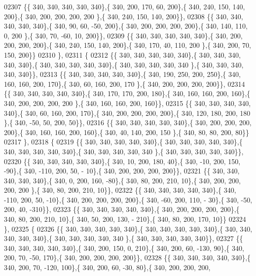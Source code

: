 \begin{DoxyCode}
02307 \{\{ 340, 340, 340, 340, 340\},\{ 340, 200, 170,  60, 200\},\{ 340, 240, 150, 140, 200\},\{ 340, 200, 200, 200, 200
      \},\{ 340, 240, 150, 140, 200\}\},
02308 \{\{ 340, 340, 340, 340, 340\},\{ 340,  90,  60, -50, 200\},\{ 340, 200, 200, 200, 200\},\{ 340, 140, 110,   0, 200
      \},\{ 340,  70, -60,  10, 200\}\},
02309 \{\{ 340, 340, 340, 340, 340\},\{ 340, 200, 200, 200, 200\},\{ 340, 240, 150, 140, 200\},\{ 340, 170,  40, 110, 200
      \},\{ 340, 200,  70, 150, 200\}\}
02310 \},
02311 \{
02312 \{\{ 340, 340, 340, 340, 340\},\{ 340, 340, 340, 340, 340\},\{ 340, 340, 340, 340, 340\},\{ 340, 340, 340, 340, 340
      \},\{ 340, 340, 340, 340, 340\}\},
02313 \{\{ 340, 340, 340, 340, 340\},\{ 340, 190, 250, 200, 250\},\{ 340, 160, 160, 200, 170\},\{ 340,  60, 160, 200, 170
      \},\{ 340, 200, 200, 200, 200\}\},
02314 \{\{ 340, 340, 340, 340, 340\},\{ 340, 170, 170, 200, 180\},\{ 340, 160, 160, 200, 160\},\{ 340, 200, 200, 200, 200
      \},\{ 340, 160, 160, 200, 160\}\},
02315 \{\{ 340, 340, 340, 340, 340\},\{ 340,  60, 160, 200, 170\},\{ 340, 200, 200, 200, 200\},\{ 340, 120, 180, 200, 180
      \},\{ 340, -50,  50, 200,  50\}\},
02316 \{\{ 340, 340, 340, 340, 340\},\{ 340, 200, 200, 200, 200\},\{ 340, 160, 160, 200, 160\},\{ 340,  40, 140, 200, 150
      \},\{ 340,  80,  80, 200,  80\}\}
02317 \},
02318 \{
02319 \{\{ 340, 340, 340, 340, 340\},\{ 340, 340, 340, 340, 340\},\{ 340, 340, 340, 340, 340\},\{ 340, 340, 340, 340, 340
      \},\{ 340, 340, 340, 340, 340\}\},
02320 \{\{ 340, 340, 340, 340, 340\},\{ 340,  10, 200, 180,  40\},\{ 340, -10, 200, 150, -90\},\{ 340, -110, 200,  50, -
      10\},\{ 340, 200, 200, 200, 200\}\},
02321 \{\{ 340, 340, 340, 340, 340\},\{ 340,   0, 200, 160, -80\},\{ 340,  80, 200, 210,  10\},\{ 340, 200, 200, 200, 200
      \},\{ 340,  80, 200, 210,  10\}\},
02322 \{\{ 340, 340, 340, 340, 340\},\{ 340, -110, 200,  50, -10\},\{ 340, 200, 200, 200, 200\},\{ 340, -60, 200, 110, -
      30\},\{ 340, -50, 200,  40, -310\}\},
02323 \{\{ 340, 340, 340, 340, 340\},\{ 340, 200, 200, 200, 200\},\{ 340,  80, 200, 210,  10\},\{ 340,  50, 200, 130, -
      210\},\{ 340,  80, 200, 170,  10\}\}
02324 \},
02325 \{
02326 \{\{ 340, 340, 340, 340, 340\},\{ 340, 340, 340, 340, 340\},\{ 340, 340, 340, 340, 340\},\{ 340, 340, 340, 340, 340
      \},\{ 340, 340, 340, 340, 340\}\},
02327 \{\{ 340, 340, 340, 340, 340\},\{ 340, 200, 150,   0, 210\},\{ 340, 200,  60, -130,  90\},\{ 340, 200,  70, -50, 
      170\},\{ 340, 200, 200, 200, 200\}\},
02328 \{\{ 340, 340, 340, 340, 340\},\{ 340, 200,  70, -120, 100\},\{ 340, 200,  60, -30,  80\},\{ 340, 200, 200, 200, 

\end{DoxyCode}
